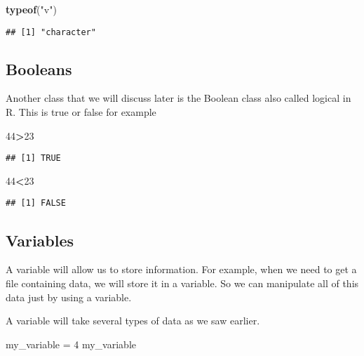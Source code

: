 \documentclass[
]{article}
\newenvironment{Shaded}{\begin{snugshade}}{\end{snugshade}}
\newcommand{\DecValTok}[1]{\textcolor[rgb]{0.00,0.00,0.81}{#1}}
\newcommand{\FunctionTok}[1]{\textcolor[rgb]{0.13,0.29,0.53}{\textbf{#1}}}
\newcommand{\NormalTok}[1]{#1}
\newcommand{\OtherTok}[1]{\textcolor[rgb]{0.56,0.35,0.01}{#1}}
\newcommand{\SpecialCharTok}[1]{\textcolor[rgb]{0.81,0.36,0.00}{\textbf{#1}}}
\newcommand{\StringTok}[1]{\textcolor[rgb]{0.31,0.60,0.02}{#1}}
\begin{document}
\begin{Shaded}
\begin{Highlighting}[]
\FunctionTok{typeof}\NormalTok{(}\StringTok{"v"}\NormalTok{)}
\end{Highlighting}
\end{Shaded}

\begin{verbatim}
## [1] "character"
\end{verbatim}

\hypertarget{booleans}{%
\subsection{Booleans}\label{booleans}}

Another class that we will discuss later is the Boolean class also
called logical in R. This is true or false for example

\begin{Shaded}
\begin{Highlighting}[]
\DecValTok{44}\SpecialCharTok{\textgreater{}}\DecValTok{23}
\end{Highlighting}
\end{Shaded}

\begin{verbatim}
## [1] TRUE
\end{verbatim}

\begin{Shaded}
\begin{Highlighting}[]
\DecValTok{44}\SpecialCharTok{\textless{}}\DecValTok{23}
\end{Highlighting}
\end{Shaded}

\begin{verbatim}
## [1] FALSE
\end{verbatim}

\hypertarget{variables}{%
\subsection{Variables}\label{variables}}

A variable will allow us to store information. For example, when we need
to get a file containing data, we will store it in a variable. So we can
manipulate all of this data just by using a variable.

A variable will take several types of data as we saw earlier.

\begin{Shaded}
\begin{Highlighting}[]
\NormalTok{my\_variable }\OtherTok{=} \DecValTok{4}
\NormalTok{my\_variable}
\end{Highlighting}
\end{Shaded}
\end{document}
